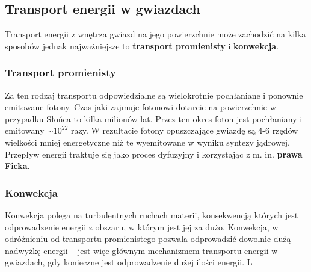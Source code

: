 \documentclass[../index.tex]{subfiles}
\begin{document}
        \subsection{Transport energii w gwiazdach}
            Transport energii z wnętrza gwiazd na jego powierzchnie może zachodzić na kilka sposobów jednak najważniejsze to \textbf{transport promienisty} i \textbf{konwekcja}.
            \subsubsection{Transport promienisty}
                Za ten rodzaj transportu odpowiedzialne są wielokrotnie pochłaniane i ponownie emitowane fotony. Czas jaki zajmuje fotonowi dotarcie na powierzchnie w przypadku Słońca to kilka milionów lat. Przez ten okres foton jest pochłaniany i emitowany \(\sim 10^{22}\) razy. W rezultacie fotony opuszczające gwiazdę są 4-6 rzędów wielkości mniej energetyczne niż te wyemitowane w wyniku syntezy jądrowej. Przepływ energii traktuje się jako proces dyfuzyjny i korzystając z m. in. \textbf{prawa Ficka}.
            \subsubsection{Konwekcja}
                Konwekcja polega na turbulentnych ruchach materii, konsekwencją których jest odprowadzenie energii z obszaru, w którym jest jej za dużo. Konwekcja, w odróżnieniu od transportu promienistego pozwala odprowadzić dowolnie dużą nadwyżkę energii \--- jest więc głównym mechanizmem transportu energii w gwiazdach, gdy konieczne jest odprowadzenie dużej ilości energii. L
\end{document}

